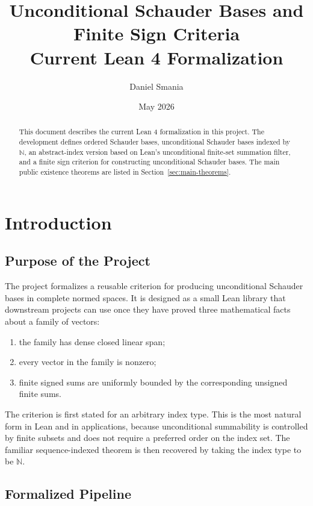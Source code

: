 \documentclass[12pt,a4paper]{article}
\title{\textbf{Unconditional Schauder Bases and Finite Sign Criteria}\\
  \large Current Lean 4 Formalization}
\author{Daniel Smania}
\date{May 2026}
\theoremstyle{definition}
\newcommand{\Nat}{\mathbb{N}}
\begin{document}
\maketitle

\begin{abstract}
This document describes the current Lean 4 formalization in this project.  The
development defines ordered Schauder bases, unconditional Schauder bases indexed
by $\Nat$, an
abstract-index version based on Lean's unconditional finite-set summation
filter, and a finite sign criterion for constructing unconditional Schauder
bases.  The main public existence theorems are
listed in Section~\ref{sec:main-theorems}.
\end{abstract}

\tableofcontents

\newpage

\section{Introduction}

\subsection{Purpose of the Project}

The project formalizes a reusable criterion for producing unconditional
Schauder bases in complete normed spaces.  It is designed as a small Lean
library that downstream projects can use once they have proved three
mathematical facts about a family of vectors:

\begin{enumerate}
  \item the family has dense closed linear span;
  \item every vector in the family is nonzero;
  \item finite signed sums are uniformly bounded by the corresponding unsigned
    finite sums.
\end{enumerate}

The criterion is first stated for an arbitrary index type.  This is the most
natural form in Lean and in applications, because unconditional summability is
controlled by finite subsets and does not require a preferred order on the
index set.  The familiar sequence-indexed theorem is then recovered by taking
the index type to be $\Nat$.

\subsection{Formalized Pipeline}
\end{document}
